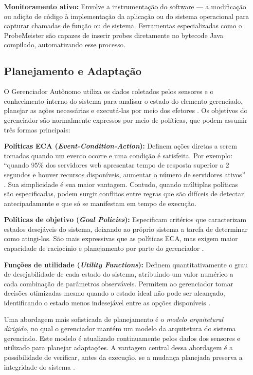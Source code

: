 \textbf{Monitoramento ativo:} Envolve a instrumentação do software --- a modificação ou adição de código à implementação da aplicação ou do sistema operacional para capturar chamadas de função ou de sistema. Ferramentas especializadas como o ProbeMeister são capazes de inserir probes diretamente no bytecode Java compilado, automatizando esse processo.

\subsection{Planejamento e Adaptação}
\label{subsec:planejamento}

O Gerenciador Autônomo utiliza os dados coletados pelos sensores e o conhecimento interno do sistema para analisar o estado do elemento gerenciado, planejar as ações necessárias e executá-las por meio dos efetores \cite{W1999392360}. Os objetivos do gerenciador são normalmente expressos por meio de políticas, que podem assumir três formas principais:

\textbf{Políticas ECA (\textit{Event-Condition-Action}):} Definem ações diretas a serem tomadas quando um evento ocorre e uma condição é satisfeita. Por exemplo: ``quando 95\% dos servidores web apresentar tempo de resposta superior a 2 segundos e houver recursos disponíveis, aumentar o número de servidores ativos'' \cite{W1999392360}. Sua simplicidade é sua maior vantagem. Contudo, quando múltiplas políticas são especificadas, podem surgir conflitos entre regras que são difíceis de detectar antecipadamente e que só se manifestam em tempo de execução.

\textbf{Políticas de objetivo (\textit{Goal Policies}):} Especificam critérios que caracterizam estados desejáveis do sistema, deixando ao próprio sistema a tarefa de determinar como atingi-los. São mais expressivas que as políticas ECA, mas exigem maior capacidade de raciocínio e planejamento por parte do gerenciador \cite{W1999392360}.

\textbf{Funções de utilidade (\textit{Utility Functions}):} Definem quantitativamente o grau de desejabilidade de cada estado do sistema, atribuindo um valor numérico a cada combinação de parâmetros observáveis. Permitem ao gerenciador tomar decisões otimizadas mesmo quando o estado ideal não pode ser alcançado, identificando o estado menos indesejável entre as opções disponíveis \cite{W1999392360}.

Uma abordagem mais sofisticada de planejamento é o \textit{modelo arquitetural dirigido}, no qual o gerenciador mantém um modelo da arquitetura do sistema gerenciado. Este modelo é atualizado continuamente pelos dados dos sensores e utilizado para planejar adaptações. A vantagem central dessa abordagem é a possibilidade de verificar, antes da execução, se a mudança planejada preserva a integridade do sistema \cite{W1999392360}.

